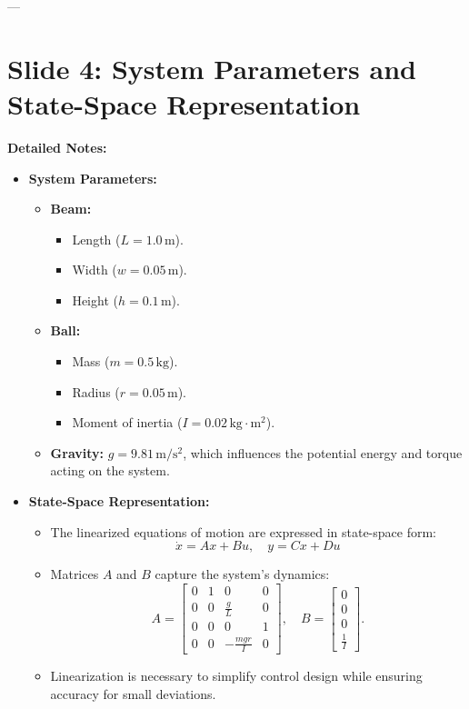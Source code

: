 \documentclass[12pt]{article}
\begin{document}
---
\newpage
\section*{Slide 4: System Parameters and State-Space Representation}
\textbf{Detailed Notes:}
\begin{itemize}
    \item \textbf{System Parameters:}
    \begin{itemize}
        \item \textbf{Beam:} 
        \begin{itemize}
            \item Length (\(L = 1.0 \, \mathrm{m}\)).
            \item Width (\(w = 0.05 \, \mathrm{m}\)).
            \item Height (\(h = 0.1 \, \mathrm{m}\)).
        \end{itemize}
        \item \textbf{Ball:}
        \begin{itemize}
            \item Mass (\(m = 0.5 \, \mathrm{kg}\)).
            \item Radius (\(r = 0.05 \, \mathrm{m}\)).
            \item Moment of inertia (\(I = 0.02 \, \mathrm{kg{\cdot}m^2}\)).
        \end{itemize}
        \item \textbf{Gravity:} \(g = 9.81 \, \mathrm{m/s^2}\), which influences the potential energy and torque acting on the system.
    \end{itemize}
    \item \textbf{State-Space Representation:}
    \begin{itemize}
        \item The linearized equations of motion are expressed in state-space form:
        \[
        \dot{x} = A x + B u, \quad y = C x + D u
        \]
        \item Matrices \(A\) and \(B\) capture the system’s dynamics:
        \[
        A = \begin{bmatrix} 
        0 & 1 & 0 & 0 \\
        0 & 0 & \frac{g}{L} & 0 \\
        0 & 0 & 0 & 1 \\
        0 & 0 & -\frac{m g r}{I} & 0 
        \end{bmatrix}, \quad 
        B = \begin{bmatrix} 
        0 \\ 
        0 \\ 
        0 \\ 
        \frac{1}{I} 
        \end{bmatrix}.
        \]
        \item Linearization is necessary to simplify control design while ensuring accuracy for small deviations.
    \end{itemize}
\end{itemize}
\end{document}
